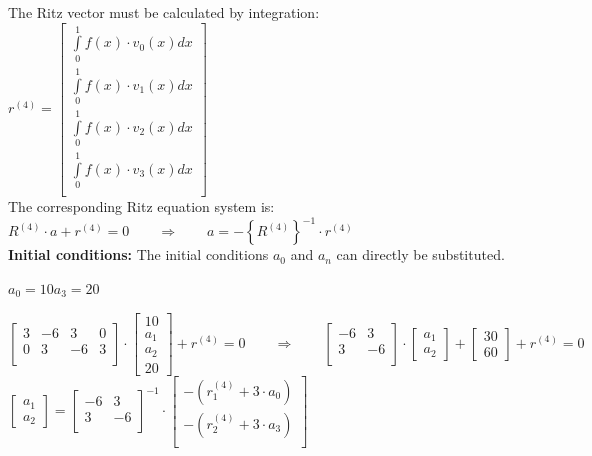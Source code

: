 The Ritz vector must be calculated by integration:\\

$r^{(4)}=
\begin{bmatrix}
	\int\limits_{0}^{1}{f(x)\cdot v_0(x)dx}\\
	\int\limits_{0}^{1}{f(x)\cdot v_1(x)dx}\\
	\int\limits_{0}^{1}{f(x)\cdot v_2(x)dx}\\
	\int\limits_{0}^{1}{f(x)\cdot v_3(x)dx}\\
\end{bmatrix}$\\

The corresponding Ritz equation system is: $\boxed{R^{(4)}\cdot a+r^{(4)}=0} \qquad\Rightarrow\qquad a=-\left\{R^{(4)}\right\}^{-1}\cdot r^{(4)}$\\

\textbf{Initial conditions:} The initial conditions $a_0$ and $a_n$ can directly be substituted.


$a_0=10$\qquad$a_3=20$

$
	\begin{bmatrix}
		3 & -6 & 3 & 0 \\
		0 & 3 & -6 & 3 \\
	\end{bmatrix}\cdot
	\begin{bmatrix}
		10\\a_1\\a_2\\20
	\end{bmatrix}+r^{(4)}=0\qquad\Rightarrow\qquad
	\begin{bmatrix}
		-6 & 3 \\
		 3 & -6 \\
	\end{bmatrix}\cdot
	\begin{bmatrix}
		a_1\\a_2
	\end{bmatrix}+
	\begin{bmatrix}
		30\\60
	\end{bmatrix}+
	r^{(4)}=0
$\\

$
	\begin{bmatrix}
			a_1\\a_2
	\end{bmatrix}=
	\begin{bmatrix}
		-6 & 3 \\
	 	 3 & -6 \\
	\end{bmatrix}^{-1}\cdot
	\begin{bmatrix}
		-\left(r^{(4)}_1+3\cdot a_0\right)\\
		-\left(r^{(4)}_2+3\cdot a_3\right)\\
	\end{bmatrix}
$

